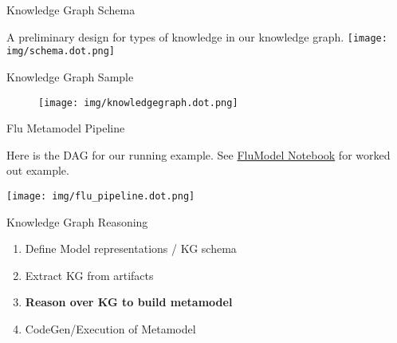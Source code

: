 \documentclass[ignorenonframetext,]{beamer}
\providecommand{\tightlist}{%
  \setlength{\itemsep}{0pt}\setlength{\parskip}{0pt}}
\begin{document}
\begin{frame}{Knowledge Graph Schema}
\protect\hypertarget{knowledge-graph-schema}{}

A preliminary design for types of knowledge in our knowledge graph.
\texttt{[image: img/schema.dot.png]}



\end{frame}

\begin{frame}{Knowledge Graph Sample}
\protect\hypertarget{knowledge-graph}{}

\begin{figure}
\centering
\texttt{[image: img/knowledgegraph.dot.png]}
\end{figure}


\end{frame}


\begin{frame}{Flu Metamodel Pipeline}
\protect\hypertarget{flu-metamodel-pipeline}{}

Here is the DAG for our running example.
See \href{}{FluModel Notebook} for worked out example.
\begin{center}
\texttt{[image: img/flu\_pipeline.dot.png]}
\end{center}


\end{frame}

\begin{frame}{Knowledge Graph Reasoning}
\protect\hypertarget{knowledge-graph-reasoning}{}

\begin{enumerate}
\tightlist
\item
  Define Model representations / KG schema
\item
  Extract KG from artifacts
\item
  \textbf{Reason over KG to build metamodel}
\item
  CodeGen/Execution of Metamodel
\end{enumerate}

\end{frame}
\end{document}
